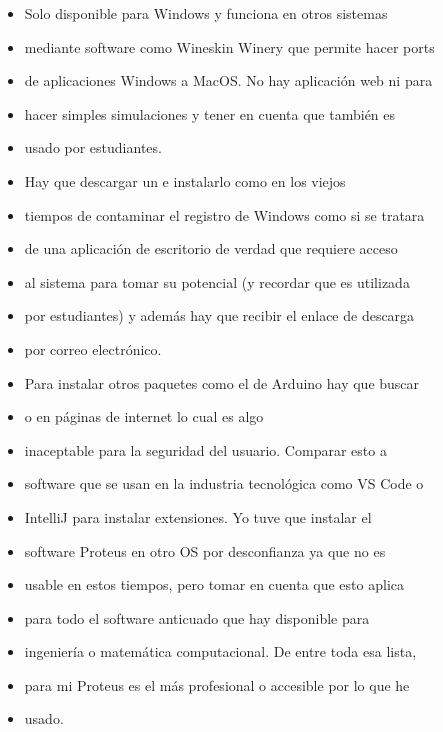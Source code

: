\documentclass{article}
\begin{document}
    \begin{itemize}
        \item Solo disponible para Windows y funciona en otros sistemas
        \item mediante software como Wineskin Winery que permite hacer ports
        \item de aplicaciones Windows a MacOS. No hay aplicación web ni para
        \item hacer simples simulaciones y tener en cuenta que también es
        \item usado por estudiantes.

        \item Hay que descargar un  e instalarlo como en los viejos
        \item tiempos de contaminar el registro de Windows como si se tratara
        \item de una aplicación de escritorio de verdad que requiere acceso
        \item al sistema para tomar su potencial (y recordar que es utilizada
        \item por estudiantes) y además hay que recibir el enlace de descarga
        \item por correo electrónico.

        \item Para instalar otros paquetes como el de Arduino hay que buscar
        \item {} o  en páginas de internet lo cual es algo
        \item inaceptable para la seguridad del usuario. Comparar esto a
        \item software que se usan en la industria tecnológica como VS Code o
        \item IntelliJ para instalar extensiones. Yo tuve que instalar el
        \item software Proteus en otro OS por desconfianza ya que no es
        \item usable en estos tiempos, pero tomar en cuenta que esto aplica
        \item para todo el software anticuado que hay disponible para
        \item ingeniería o matemática computacional. De entre toda esa lista,
        \item para mi Proteus es el más profesional o accesible por lo que he
        \item usado.


\end{itemize}
\end{document}
